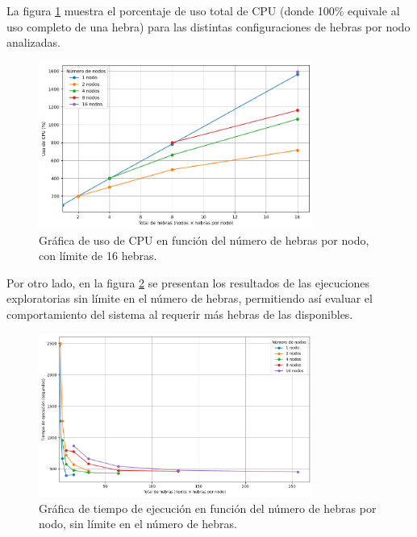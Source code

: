 La figura \ref{fig:exploratory_threads_limit_cpu} muestra el porcentaje de uso total de CPU (donde 100\% equivale al uso completo de una hebra) para las distintas configuraciones de hebras por nodo analizadas.

\begin{figure}[ht]
    \centering
    \includegraphics[width=0.8\textwidth]{imagenes/cap5/exploratory_threads_limit_cpu.png}
    \caption{Gráfica de uso de CPU en función del número de hebras por nodo, con límite de 16 hebras.}
    \label{fig:exploratory_threads_limit_cpu}
\end{figure}

Por otro lado, en la figura \ref{fig:exploratory_threads_no-limit_time} se presentan los resultados de las ejecuciones exploratorias sin límite en el número de hebras, permitiendo así evaluar el comportamiento del sistema al requerir más hebras de las disponibles.

\begin{figure}[ht]
    \centering
    \includegraphics[width=0.8\textwidth]{imagenes/cap5/exploratory_threads_no-limit_time.png}
    \caption{Gráfica de tiempo de ejecución en función del número de hebras por nodo, sin límite en el número de hebras.}
    \label{fig:exploratory_threads_no-limit_time}
\end{figure}

